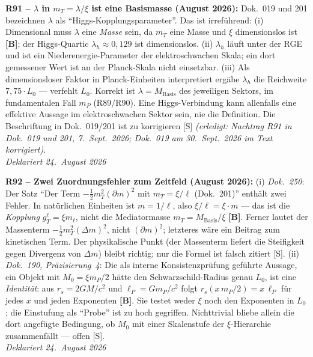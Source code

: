 \medskip
\textbf{R91 -- $\lambda$ in $m_T = \lambda/\xi$ ist eine Basismasse (August 2026):}
Dok.~019 und 201 bezeichnen $\lambda$ als \enquote{Higgs-Kopplungsparameter}. Das ist irref\"uhrend:
(i) Dimensional muss $\lambda$ eine \emph{Masse} sein, da $m_T$ eine Masse und $\xi$ dimensionslos ist \textbf{[B]}; der Higgs-Quartic $\lambda_h \approx 0{,}129$ ist dimensionslos.
(ii) $\lambda_h$ l\"auft unter der RGE und ist ein Niederenergie-Parameter der elektroschwachen Skala; ein dort gemessener Wert ist an der Planck-Skala nicht einsetzbar.
(iii) Als dimensionsloser Faktor in Planck-Einheiten interpretiert erg\"abe $\lambda_h$ die Reichweite $7{,}75\cdot L_0$ --- verfehlt $L_0$.
Korrekt ist $\lambda = M_\mathrm{Basis}$ des jeweiligen Sektors, im fundamentalen Fall $m_P$ (R89/R90).
Eine Higgs-Verbindung kann allenfalls eine effektive Aussage im elektroschwachen Sektor sein, nie die Definition. Die Beschriftung in Dok.~019/201 ist zu korrigieren [S] \emph{(erledigt: Nachtrag R91 in Dok.~019 und 201, 7.~Sept.~2026; Dok.~019 am 30.~Sept.~2026 im Text korrigiert)}.\\
\emph{Deklariert 24.~August 2026}

\medskip
\textbf{R92 -- Zwei Zuordnungsfehler zum Zeitfeld (August 2026):}
(i) \emph{Dok.~250}: Der Satz \enquote{Der Term $-\tfrac12 m_T^2(\partial m)^2$ mit $m_T = \xi/\ell$ (Dok.~201)} enth\"alt zwei Fehler.
In nat\"urlichen Einheiten ist $m = 1/\ell$, also $\xi/\ell = \xi\cdot m$ --- das ist die \emph{Kopplung} $g_T^\ell = \xi m_\ell$, nicht die Mediatormasse $m_T = M_\mathrm{Basis}/\xi$ \textbf{[B]}.
Ferner lautet der Massenterm $-\tfrac12 m_T^2(\Delta m)^2$, nicht $(\partial m)^2$; letzteres w\"are ein Beitrag zum kinetischen Term.
Der physikalische Punkt (der Massenterm liefert die Steifigkeit gegen Divergenz von $\Delta m$) bleibt richtig; nur die Formel ist falsch zitiert [S].
(ii) \emph{Dok.~190, Pr\"azisierung~4}: Die als interne Konsistenzpr\"ufung gef\"uhrte Aussage, ein Objekt mit $M_0 = \xi m_P/2$ h\"atte den Schwarzschild-Radius genau $L_0$, ist eine \emph{Identit\"at}: aus $r_s = 2GM/c^2$ und $\ell_P = G m_P/c^2$ folgt $r_s(x\,m_P/2) = x\,\ell_P$ f\"ur jedes $x$ und jeden Exponenten \textbf{[B]}.
Sie testet weder $\xi$ noch den Exponenten in $L_0$; die Einstufung als \enquote{Probe} ist zu hoch gegriffen. Nichttrivial bliebe allein die dort angef\"ugte Bedingung, ob $M_0$ mit einer Skalenstufe der $\xi$-Hierarchie zusammenf\"allt --- offen [S].\\
\emph{Deklariert 24.~August 2026}

\medskip

